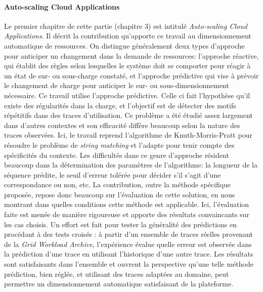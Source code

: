 \documentclass[a4paper,12pt]{article}
\begin{document}
\paragraph{Auto-scaling Cloud  Applications}
\vspace{-3mm}
Le   premier   chapitre   de   cette    partie   (chapitre   3)   est   intitulé
\textit{Auto-scaling Cloud  Applications}. Il décrit la  contribution qu'apporte
ce  travail   au  dimensionnement  automatique  de   ressources.   On  distingue
généralement deux types d'approche pour  anticiper un changement dans la demande
de ressources: l'approche  réactive, qui établit des règles  selon lesquelles le
système doit se comporter pour réagir à un état de sur- ou sous-charge constaté,
et  l'approche prédictive  qui  vise  à prévoir  le  changement  de charge  pour
anticiper  le  sur-  ou  sous-dimensionnement nécessaire.   Ce  travail  utilise
l'approche prédictive.  Celle  ci fait l'hypothèse qu'il  existe des régularités
dans la  charge, et l'objectif  est de détecter  des motifs répétitifs  dans des
traces d'utilisation.   Ce problème a  été étudié assez largement  dans d'autres
contextes  et  son  efficacité  diffère  beaucoup selon  la  nature  des  traces
observées.   Ici, le  travail  reprend l'algorithme  de Knuth-Morris-Pratt  pour
résoudre le problème  de \textit{string matching} et l'adapte  pour tenir compte
des spécificités du contexte. Les  difficultés dans ce genre d'approche résident
beaucoup dans la détermination des paramètres de l'algorithme: la longueur de la
séquence  prédite, le  seuil d'erreur  tolérée  pour décider  s'il s'agit  d'une
correspondance  ou  non, etc.   La  contribution,  outre la  méthode  spécifique
proposée,  repose donc  beaucoup sur  l'évaluation  de cette  solution, en  nous
montrant dans quelles conditions cette méthode est applicable. Ici, l'évaluation
faite est menée de manière rigoureuse  et apporte des résultats convaincants sur
les cas choisis. Un effort est fait pour tester la généralité des prédictions en
procédant  à des  tests  croisés :  à  partir d'un  ensemble  de traces  réelles
provenant  de  la \textit{Grid  Workload  Archive},  l'expérience évalue  quelle
erreur est  observée dans  la prédiction d'une  trace en  utilisant l'historique
d'une autre trace.  Les résultats  sont satisfaisants dans l'ensemble et ouvrent
la perspective  qu'une telle méthode  prédiction, bien réglée, et  utilisant des
traces  adaptées  au  domaine,  peut permettre  un  dimensionnement  automatique
satisfaisant de la plateforme.
\end{document}
